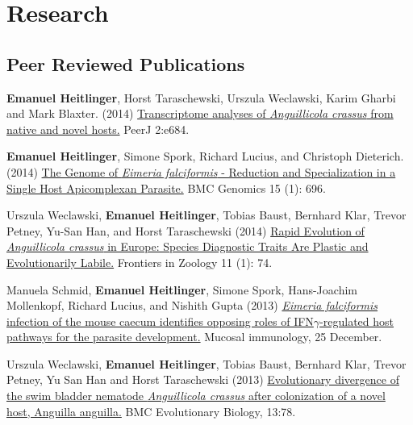 \documentclass[10pt,a4paper]{article}
\renewenvironment{itemize}{
  \begin{list}{}{
    \setlength{\leftmargin}{2.5em}
    \setlength{\itemsep}{0.25em}
    \setlength{\parskip}{0pt}
    \setlength{\parsep}{0.25em}
  }
}{
  \end{list}
}
\begin{document}

\section*{Research}

\subsection*{Peer Reviewed Publications}

\begin{itemize}


\item \textbf{Emanuel Heitlinger}, Horst Taraschewski, Urszula
  Weclawski, Karim Gharbi and Mark Blaxter. (2014)
  \href{https://peerj.com/articles/684/}{Transcriptome analyses of
    \textit{Anguillicola crassus} from native and novel hosts.}  PeerJ
  2:e684.

\item \textbf{Emanuel Heitlinger}, Simone Spork, Richard Lucius, and
  Christoph Dieterich. (2014)
  \href{http://www.biomedcentral.com/1471-2164/15/696/abstract}{The
    Genome of \textit{Eimeria falciformis} - Reduction and Specialization in a
    Single Host Apicomplexan Parasite.} BMC Genomics 15 (1): 696.

\item Urszula Weclawski, \textbf{Emanuel Heitlinger}, Tobias Baust,
  Bernhard Klar, Trevor Petney, Yu-San Han, and Horst Taraschewski
  (2014) \href{http://www.frontiersinzoology.com/content/11/1/74}{
    Rapid Evolution of \textit{Anguillicola crassus} in Europe: Species
    Diagnostic Traits Are Plastic and Evolutionarily Labile.}
  Frontiers in Zoology 11 (1): 74.

\item Manuela Schmid, \textbf{Emanuel Heitlinger}, Simone Spork, Hans-Joachim
  Mollenkopf, Richard Lucius, and Nishith Gupta (2013)
  \href{http://www.nature.com/mi/journal/vaop/ncurrent/full/mi2013115a.html}
  {\textit{Eimeria falciformis} infection of the mouse caecum identifies
    opposing roles of IFN$\gamma$-regulated host pathways for the parasite
    development.} Mucosal immunology, 25 December.

\item Urszula Weclawski, \textbf{Emanuel Heitlinger}, Tobias Baust,
  Bernhard Klar, Trevor Petney, Yu San Han and Horst Taraschewski
  (2013) 
  \href{http://www.biomedcentral.com/1471-2148/13/78}{
    Evolutionary divergence of the swim bladder nematode
    \textit{Anguillicola crassus} after colonization of a novel host,
    Anguilla anguilla.} BMC Evolutionary Biology,
  13:78.


\end{itemize}
\end{document}
